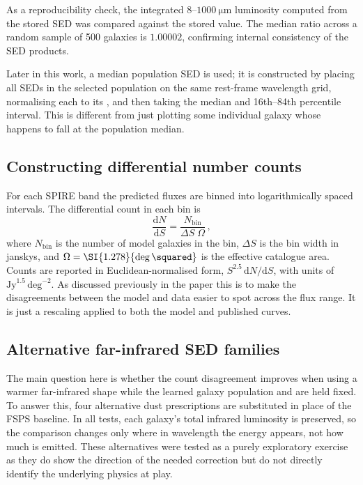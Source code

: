 \documentclass[12pt,a4paper]{article}
\begin{document}
As a reproducibility check, the integrated $8$--$\SI{1000}{\um}$ luminosity computed
from the stored SED was compared against the stored \LIR{} value. The median ratio
across a random sample of 500 galaxies is $1.00002$, confirming internal consistency of
the SED products.

Later in this work, a median population SED is used; it is constructed by placing
all SEDs in the selected population on the same rest-frame wavelength grid, normalising
each to its \LIR{}, and then taking the median and 16th--84th percentile
interval. This is different from just plotting some individual galaxy whose \LIR{} happens to
fall at the population median.

\subsection{Constructing differential number counts}
\label{sec:methods:counts}

For each SPIRE band the predicted fluxes are binned into logarithmically spaced
intervals. The differential count in each bin is
\begin{equation}
  \frac{\mathrm{d}N}{\mathrm{d}S} = \frac{N_\mathrm{bin}}{\Delta S \;\Omega}\,,
\end{equation}
where $N_\mathrm{bin}$ is the number of model galaxies in the bin, $\Delta S$ is the
bin width in janskys, and $\Omega = \SI{1.278}{\deg\squared}$ is the effective catalogue
area. Counts are reported in Euclidean-normalised form,
$S^{2.5}\,\mathrm{d}N/\mathrm{d}S$, with units of
$\mathrm{Jy}^{1.5}\,\mathrm{deg}^{-2}$. As discussed previously in the paper this is to make the disagreements between the model and data easier to spot across the flux range. It is just a rescaling applied to both the model and published curves.

\subsection{Alternative far-infrared SED families}
\label{sec:methods:templates}

The main question here is whether the count disagreement improves when using a warmer far-infrared
shape while the learned galaxy population and \LIR{} are held fixed. To answer this, four
alternative dust prescriptions are substituted in place of the FSPS baseline. In all tests, each galaxy's total infrared luminosity is preserved, so the
comparison changes only where in wavelength the energy appears, not how much is emitted.
These alternatives were tested as a purely exploratory exercise as they do show the direction of the needed correction but do not directly identify the underlying physics at play. 
\end{document}
